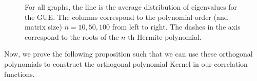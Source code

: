 \begin{observacao}
\begin{figure}[H]
\begin{subfigure}{0.3\textwidth}
		\end{subfigure} \hfill
		\caption{For all graphs, the line is the average distribution of eigenvalues for the GUE. The columns correspond to the polynomial order (and matrix size) $n = 10,50,100$ from left to right. The dashes in the axis correspond to the roots of the $n$-th Hermite polynomial.}
	\end{figure}
\end{observacao}


Now, we prove the following proposition such that we can use these orthogonal polynomials to construct the orthogonal polynomial Kernel in our correlation functions.

